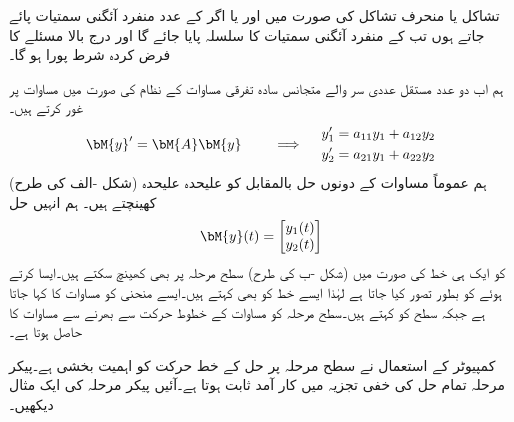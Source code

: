  تشاکل یا منحرف تشاکل   کی صورت میں اور یا اگر  کے  عدد منفرد آئگنی سمتیات پائے جاتے ہوں تب  کے منفرد آئگنی سمتیات کا سلسلہ پایا جائے گا اور درج بالا مسئلے کا فرض کردہ شرط پورا ہو گا۔


ہم اب  دو عدد مستقل عددی سر والے متجانس سادہ تفرقی  مساوات کے نظام کی صورت میں مساوات  پر غور کرتے ہیں۔
\begin{gather}\label{مساوات_نظام_سطح_مرحلہ_الف}
\begin{aligned}
\bM{y}'=\bM{A}\bM{y}\quad 
\end{aligned}\quad \implies \quad 
\begin{aligned}
y_1'&=a_{11}y_1+a_{12}y_2\\
y_2'&=a_{21}y_1+a_{22}y_2
\end{aligned}
\end{gather}
ہم عموماً مساوات  کے دونوں حل بالمقابل  کو علیحدہ علیحدہ (شکل -الف کی طرح) کھینچتے ہیں۔ ہم انہیں حل
\begin{align}
\bM{y}(t)=\begin{bmatrix} y_1(t) \\ y_2(t) \end{bmatrix}
\end{align}
کو ایک ہی خط کی صورت میں (شکل -ب کی طرح) سطح مرحلہ پر بھی کھینچ سکتے ہیں۔ایسا کرتے ہوئے  کو بطور  تصور کیا جاتا ہے لہٰذا ایسے خط کو  بھی کہتے ہیں۔ایسے منحنی کو مساوات  کا  کہا جاتا ہے جبکہ  سطح کو  کہتے ہیں۔سطح مرحلہ کو مساوات  کے خطوط حرکت سے بھرنے سے  مساوات  کا  حاصل ہوتا ہے۔ 

کمپیوٹر کے استعمال نے سطح مرحلہ پر حل کے خط حرکت کو اہمیت بخشی ہے۔پیکر مرحلہ تمام حل کی خفی تجزیہ میں کار آمد ثابت ہوتا ہے۔آئیں پیکر مرحلہ کی ایک مثال دیکھیں۔

